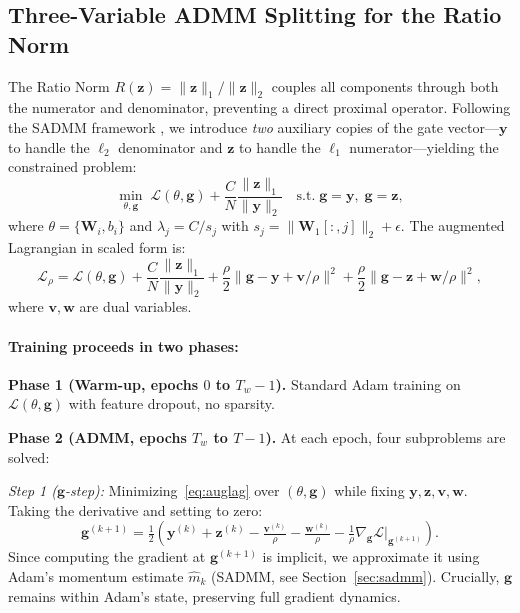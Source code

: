 \documentclass{uai2026} %
\theoremstyle{definition}
\theoremstyle{remark}
\newcommand{\bz}{\mathbf{z}}
\newcommand{\bg}{\mathbf{g}}
\newcommand{\bv}{\mathbf{v}}
\newcommand{\bw}{\mathbf{w}}
\newcommand{\by}{\mathbf{y}}
\newcommand{\bW}{\mathbf{W}}
\begin{document}
\subsection{Three-Variable ADMM Splitting for the Ratio Norm}\label{sec:admm}

The Ratio Norm $R(\bz) = \lVert\bz\rVert_1 / \lVert\bz\rVert_2$ couples all components through both the numerator and denominator, preventing a direct proximal operator.
Following the SADMM framework \citep{yu2026sadmm}, we introduce \emph{two} auxiliary copies of the gate vector---$\by$ to handle the $\ell_2$ denominator and $\bz$ to handle the $\ell_1$ numerator---yielding the constrained problem:
\begin{equation}\label{eq:admm-obj}
    \min_{\theta,\bg}\;\mathcal{L}(\theta,\bg) + \frac{C}{N}\frac{\lVert\bz\rVert_1}{\lVert\by\rVert_2}
    \quad\text{s.t.}\;\bg = \by,\;\bg = \bz,
\end{equation}
where $\theta = \{\bW_i, b_i\}$ and $\lambda_j = C / s_j$ with $s_j = \lVert\bW_1[:,j]\rVert_2 + \epsilon$.
The augmented Lagrangian in scaled form is:
\begin{equation}\label{eq:auglag}
    \mathcal{L}_\rho = \mathcal{L}(\theta,\bg)
    + \frac{C}{N}\frac{\lVert\bz\rVert_1}{\lVert\by\rVert_2}
    + \frac{\rho}{2}\lVert\bg - \by + \bv/\rho\rVert^2
    + \frac{\rho}{2}\lVert\bg - \bz + \bw/\rho\rVert^2,
\end{equation}
where $\bv,\bw$ are dual variables.

\paragraph{Training proceeds in two phases:}

\textbf{Phase 1 (Warm-up, epochs $0$ to $T_w{-}1$).}
Standard Adam \citep{kingma2015adam} training on $\mathcal{L}(\theta,\bg)$ with feature dropout, no sparsity.

\textbf{Phase 2 (ADMM, epochs $T_w$ to $T{-}1$).}
At each epoch, four subproblems are solved:

\textit{Step 1 ($\bg$-step):} Minimizing~\eqref{eq:auglag} over $(\theta,\bg)$ while fixing $\by,\bz,\bv,\bw$.
Taking the derivative and setting to zero:
\begin{equation}\label{eq:gstep}
    \bg^{(k+1)} = \tfrac{1}{2}\!\left(\by^{(k)} + \bz^{(k)}
    - \tfrac{\bv^{(k)}}{\rho} - \tfrac{\bw^{(k)}}{\rho}
    - \tfrac{1}{\rho}\nabla_{\bg}\mathcal{L}\big|_{\bg^{(k+1)}}\right).
\end{equation}
Since computing the gradient at $\bg^{(k+1)}$ is implicit, we approximate it using Adam's momentum estimate $\hat{m}_k$ (SADMM, see Section~\ref{sec:sadmm}).
Crucially, $\bg$ remains within Adam's state, preserving full gradient dynamics.
\end{document}
